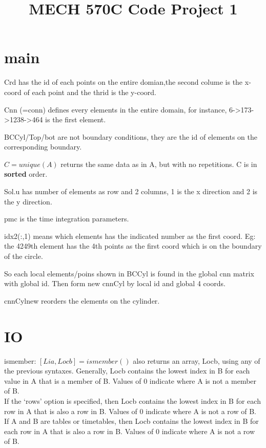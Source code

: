 \documentclass[a4paper,12pt]{article} %
\begin{document}
\title{MECH 570C Code Project 1}
\maketitle


\section{main}
Crd has the id of each points on the entire domian,the second colume is the x-coord of each point and the thrid is the y-coord.

Cnn (=conn) defines every elements in the entire domain, for instance, 6->173->1238->464 is the first element.

BCCyl/Top/bot are not boundary conditions, they are the id of elements on the corresponding boundary.

$C = unique(A)$ returns the same data as in A, but with no repetitions. C is in \textbf{sorted} order.

Sol.u has number of elements as row and 2 columns, 1 is the x direction and 2 is the y direction.

pmc is the time integration parameters.

idx2(:,1) means which elements has the indicated number as the first coord. Eg: the 4249th element has the 4th points as the first coord which is on
the boundary of the circle. 

So each local elements/poins shown in BCCyl is found in the global cnn matrix with global id. Then form new cnnCyl by local id and
global 4 coords.

cnnCylnew reorders the elements on the cylinder.

\section{IO}
ismember: $[Lia,Locb] = ismember()$ also returns an array, Locb, using any of the previous syntaxes.
Generally, Locb contains the lowest index in B for each value in A that is a member of B. Values of 0 indicate where A is not a member of B.\\
If the `rows' option is specified, then Locb contains the lowest index in B for each row in A that is also a row in B. Values of 0 indicate where A is not a row of B.\\
If A and B are tables or timetables, then Locb contains the lowest index in B for each row in A that is also a row in B. Values of 0 indicate where A is not a row of B.
\end{document}
